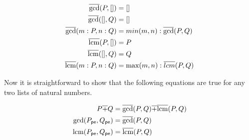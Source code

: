 \begin{align*}
	\overline{\gcd}(P,[]) &= []\\
	\overline{\gcd}([],Q) &= []\\
	\overline{\gcd}(m:P, n:Q) &= min(m,n):\overline{\gcd}(P,Q)\\
	\overline{\operatorname{lcm}}(P,[]) &= P\\
	\overline{\operatorname{lcm}}([],Q) &= Q\\
	\overline{\operatorname{lcm}}(m:P,n:Q) &= \max(m,n):\overline{lcm}(P,Q)
\end{align*}

Now it is straightforward to show that the following equations are true for any two lists of natural numbers.

\begin{align*}
P\overline{+} Q &= \overline{\gcd}(P,Q) \overline+ \overline{\operatorname{lcm}}(P,Q)\\
\gcd(P_{\mathord{\textsf{pe}}}, Q_{\mathord{\textsf{pe}}}) &= \overline{\gcd}(P,Q)\\
\operatorname{lcm}(P_{\mathord{\textsf{pe}}}, Q_{\mathord{\textsf{pe}}}) &= \overline{\operatorname{lcm}}(P,Q)
\end{align*}